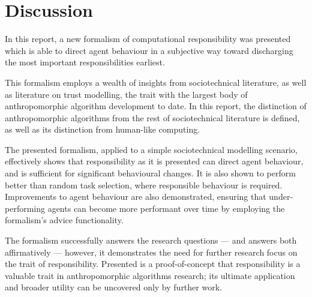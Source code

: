 \section{Discussion}
In this report, a new formalism of computational responsibility was presented which is able to direct agent behaviour in a subjective way toward discharging the most important responsibilities earliest.\par

This formalism employs a wealth of insights from sociotechnical literature, as well as literature on trust modelling, the trait with the largest body of anthropomorphic algorithm development to date. In this report, the distinction of anthropomorphic algorithms from the rest of sociotechnical literature is defined, as well as its distinction from  human-like computing.\par

The presented formalism, applied to a simple sociotechnical modelling scenario, effectively shows that responsibility as it is presented can direct agent behaviour, and is sufficient for significant behavioural changes. It is also shown to perform better than random task selection, where responsible behaviour is required. Improvements to agent behaviour are also demonstrated, ensuring that under-performing agents can become more performant over time by employing the formalism's advice functionality.\par

The formalism successfully answers the research questions --- and answers both affirmatively --- however, it demonstrates the need for further research focus on the trait of responsibility. Presented is a proof-of-concept that responsibility is a valuable trait in anthropomorphic algorithms research; its ultimate application and broader utility can be uncovered only by further work.




